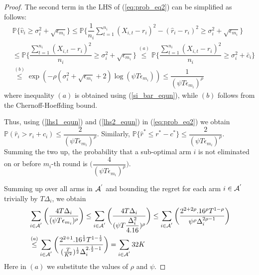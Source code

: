 \begin{proof}
 
The second term in the LHS of (\ref{eq:prob_eq2}) can be simplified as follows:
\begin{align}
&\mathbb{P}\bigg\lbrace \hat{v}_{i}\geq \sigma_{i}^{2}+\sqrt{\epsilon_{m_{i}}}\bigg\rbrace\nonumber
\leq \mathbb{P}\bigg\lbrace \dfrac{1}{n_{i}}\sum_{t=1}^{n_{i}}(X_{i,t}-r_{i})^{2}-(\hat{r}_{i}-r_{i})^{2}\geq \sigma_{i}^{2}+\sqrt{\epsilon_{m_{i}}}\bigg\rbrace\nonumber\\
&\leq \mathbb{P}\bigg\lbrace \dfrac{\sum_{t=1}^{n_{i}}(X_{i,t}-r_{i})^{2}}{n_{i}}\geq \sigma_{i}^{2}+\sqrt{\epsilon_{m_{i}}} \bigg\rbrace\nonumber
\overset{(a)}{\leq} \mathbb{P}\bigg\lbrace \dfrac{\sum_{t=1}^{n_{i}}(X_{i,t}-r_{i})^{2}}{n_{i}}\geq \sigma_{i}^{2} + \bar{c}_i\bigg\rbrace \nonumber\\
&\overset{(b)}{\leq} \exp\left(- \rho (\sigma_{i}^{2}+\sqrt{\epsilon_{m_{i}}} + 2)\log(\psi  T\epsilon_{m_{i}})\right)
\le \dfrac{1}{(\psi  T\epsilon_{m_{i}})^{\rho}}
\label{lhs2_equn}
\end{align}
where inequality $(a)$ is obtained using (\ref{si_bar_equn}), while $(b)$ follows from the Chernoff-Hoeffding bound.
  
Thus, using (\ref{lhs1_equn}) and (\ref{lhs2_equn}) in (\ref{eq:prob_eq2}) we obtain $\mathbb{P}(\hat{r}_{i}> r_{i} + c_{i})\le \dfrac{2}{(\psi  T\epsilon_{m_{i}})^{\rho}}$. Similarly, $\mathbb{P}\lbrace\hat{r}^{*}\leq r^{*} - c^{*}\rbrace \leq \dfrac{2}{(\psi  T\epsilon_{m_{i}})^{\rho}}$. Summing the two up, the probability that a sub-optimal arm ${i}$ is not eliminated on or before $m_{i}$-th round is  $\bigg(\dfrac{4}{(\psi T\epsilon_{m_{i}})^{\rho}} \bigg)$.

Summing up over all arms in $\mathcal{A}^{'}$ and bounding the regret for each arm $i\in \mathcal{A}^{'}$ trivially by $T\Delta_{i}$, we obtain
   \begin{align*}
&\sum_{i\in \mathcal{A}^{'}}\bigg(\dfrac{4T\Delta_{i}}{(\psi T\epsilon_{m_{i}})^{\rho}}\bigg)
\leq\sum_{i\in \mathcal{A}^{'}}\bigg(\dfrac{4T\Delta_{i}}{(\psi T\dfrac{\Delta_{i}^{2}}{4.16})^{\rho}}\bigg)
\leq \sum_{i\in \mathcal{A}^{'}}\bigg(\dfrac{2^{2+2\rho}.16^{\rho}T^{1-\rho}}{\psi^{\rho}\Delta_{i}^{2\rho -1}}\bigg)\\  
& \overset{(a)}{\leq} \sum_{i\in \mathcal{A}^{'}}\bigg(\dfrac{2^{2+1}.16^{\frac{1}{2}}T^{1-\frac{1}{2}}}{(\frac{T}{K^2})^{\frac{1}{2}}\Delta_{i}^{2.\frac{1}{2} -1}}\bigg) = \sum_{i\in \mathcal{A}^{'}}  32 K  
   \end{align*}
   Here in $(a)$ we substitute the values of $\rho$ and $\psi$.


\end{proof}
